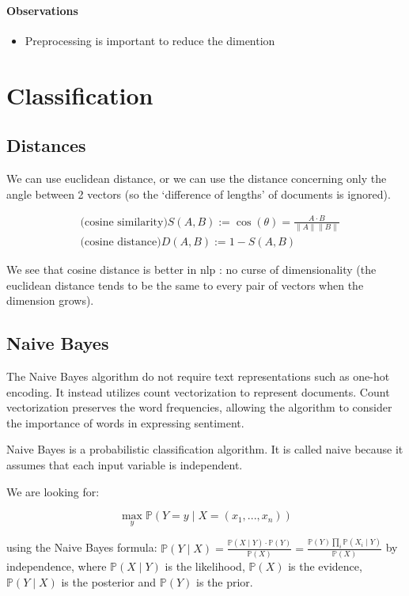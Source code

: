 \documentclass{article}
\begin{document}
\paragraph{Observations}
\begin{itemize}
  \item Preprocessing is important to reduce the dimention
\end{itemize}

\section{Classification}

\subsection{Distances}

We can use euclidean distance, or we can use the distance concerning
only the angle between 2 vectors (so the `difference of lengths' of documents
is ignored).

$$
\begin{aligned}
&\text{(cosine similarity)}S(A, B) :=
\cos (\theta)=\frac{A \cdot B}{\|A\|\|B\|}\\
&\text{(cosine distance)}D(A, B) :=1-S(A, B)
\end{aligned}
$$

We see that cosine distance is better in nlp : no curse of dimensionality (the euclidean
distance tends to be the same to every pair of vectors when the dimension grows).

\subsection{Naive Bayes}

The Naive Bayes algorithm do not require text representations such as one-hot encoding. It instead utilizes count vectorization to represent documents. Count vectorization preserves the word frequencies, allowing the algorithm to consider the importance of words in expressing sentiment.

Naive Bayes is a probabilistic classification algorithm.
It is called naive because it assumes that each input variable is independent.

We are looking for:

$$ \max_{y}\mathbb{P}(Y =y \mid X=(x_1, ..., x_n)) $$

using the Naive Bayes formula: $\mathbb{P}(Y \mid X) = \frac{\mathbb{P}(X\mid Y)\cdot \mathbb{P}(Y)}{\mathbb{P}(X)} = \frac{\mathbb{P}(Y)\prod_{i}^{}\mathbb{P}(X_i\mid Y)}{\mathbb{P}(X)}$
by independence,
where $\mathbb{P}(X\mid Y)$ is the likelihood, $\mathbb{P}(X)$ is the evidence, $\mathbb{P}(Y \mid X)$ is the posterior and $\mathbb{P}(Y)$ is the prior.
\end{document}
